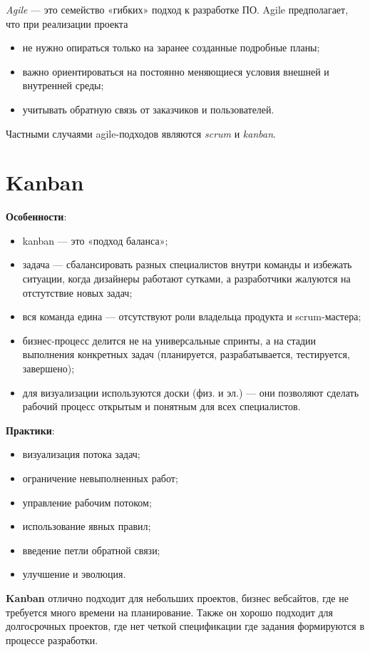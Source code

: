 \documentclass[a4paper,12pt,oneside]{extbook}
\begin{document}
\textit{Agile} — это семейство «гибких» подход к разработке ПО. Agile предполагает, что при реализации проекта
\begin{itemize}
    \item не нужно опираться только на заранее созданные подробные планы;
    \item важно ориентироваться на постоянно меняющиеся условия внешней и внутренней среды;
    \item учитывать обратную связь от заказчиков и пользователей.
\end{itemize}

Частными случаями agile-подходов являются \textit{scrum} и \textit{kanban}.

\section{Kanban}%
\label{sec:Kanban}

\textbf{Особенности}:
\begin{itemize}
    \item kanban — это «подход баланса»;
    \item задача — сбалансировать разных специалистов внутри команды и избежать ситуации, когда дизайнеры работают сутками, а разработчики жалуются на отстутствие новых задач;
    \item вся команда едина — отсутствуют роли владельца продукта и scrum-мастера;
    \item бизнес-процесс делится не на универсальные спринты, а на стадии выполнения конкретных задач (планируется, разрабатывается, тестируется, завершено);
    \item для визуализации используются доски (физ. и эл.) — они позволяют сделать рабочий процесс открытым и понятным для всех специалистов.
\end{itemize}

\textbf{Практики}:
\begin{itemize}
    \item визуализация потока задач;
    \item ограничение невыполненных работ;
    \item управление рабочим потоком;
    \item использование явных правил;
    \item введение петли обратной связи;
    \item улучшение и эволюция.
\end{itemize}

\textbf{Kanban} отлично подходит для небольших проектов, бизнес вебсайтов, где не требуется много времени на планирование. Также он хорошо подходит для долгосрочных проектов, где нет четкой спецификации где задания формируются в процессе разработки.
\end{document}
